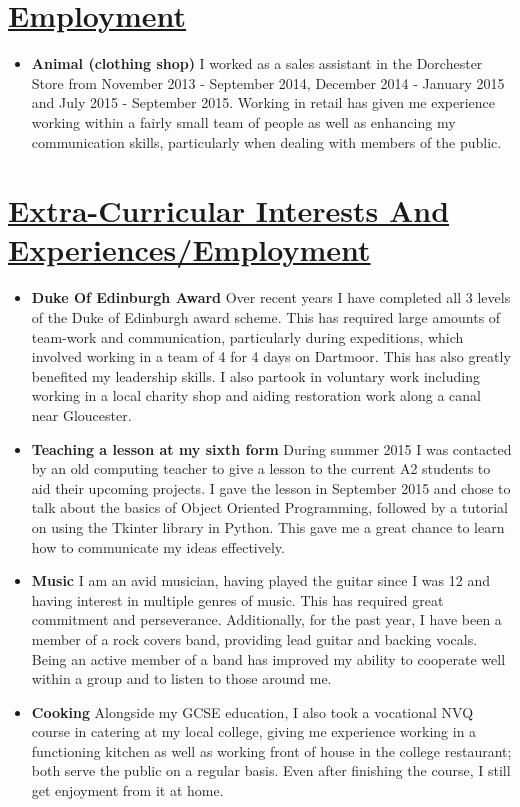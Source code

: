 \documentclass[11pt]{article}
\begin{document}
	\vspace{-20pt}
	\hspace{-100pt}\section*{\underline{Employment}}
			\begin{itemize}
				\item \textbf{Animal (clothing shop) }I worked as a sales assistant in the Dorchester Store from November 2013 - September 2014, December 2014 - January 2015 and July 2015 - September 2015. Working in retail has given me experience working within a fairly small team of people as well as enhancing my communication skills, particularly when dealing with members of the public. 
			\end{itemize}

	\vspace{-20pt}
	\hspace{-100pt}\section*{\underline{Extra-Curricular Interests And Experiences/Employment}}
			\begin{itemize}
				\item \textbf{Duke Of Edinburgh Award} Over recent years I have completed all 3 levels of the Duke of Edinburgh award scheme. This has required large amounts of team-work and communication, particularly during expeditions, which involved working in a team of 4 for 4 days on Dartmoor. This has also greatly benefited my leadership skills. I also partook in voluntary work including working in a local charity shop and aiding restoration work along a canal near Gloucester.
				\item \textbf{Teaching a lesson at my sixth form} During summer 2015 I was contacted by an old computing teacher to give a lesson to the current A2 students to aid their upcoming projects. I gave the lesson in September 2015 and chose to talk about the basics of Object Oriented Programming, followed by a tutorial on using the Tkinter library in Python. This gave me a great chance to learn how to communicate my ideas effectively. 
				\item \textbf{Music} I am an avid musician, having played the guitar since I was 12 and having interest in multiple genres of music. This has required great commitment and perseverance. Additionally, for the past year, I have been a member of a rock covers band, providing lead guitar and backing vocals. Being an active member of a band has improved my ability to cooperate well within a group and to listen to those around me. 
				\item \textbf{Cooking} Alongside my GCSE education, I also took a vocational NVQ course in catering at my local college, giving me experience working in a functioning kitchen as well as working front of house in the college restaurant; both serve the public on a regular basis. Even after finishing the course, I still get enjoyment from it at home.
			\end{itemize}
\end{document}
